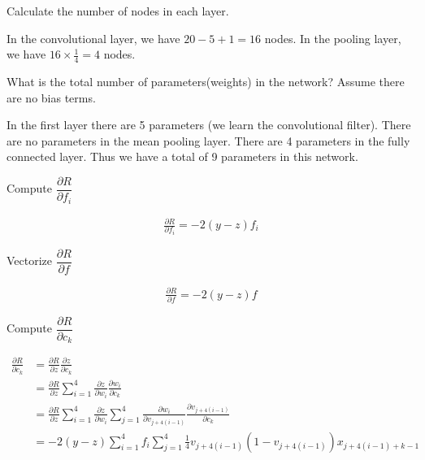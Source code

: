 \begin{Parts}
\Part Calculate the number of nodes in each layer.
\begin{solution}
In the convolutional layer, we have $20 - 5 + 1 = 16$ nodes. In the pooling layer, we have $16 \times \frac{1}{4} = 4$ nodes.
\end{solution}

\Part What is the total number of parameters(weights) in the network? Assume there are no bias terms.
\begin{solution}
In the first layer there are 5 parameters (we learn the convolutional filter). There are no parameters in the mean pooling layer. There are 4 parameters in the fully connected layer. Thus we have a total of 9 parameters in this network.
\end{solution}

\Part Compute $\dfrac{\partial R}{\partial f_i}$
\begin{solution}
\begin{align*}
    \frac{\partial R}{\partial f_i} = -2(y-z)f_i
\end{align*}
\end{solution}

\Part Vectorize $\dfrac{\partial R}{\partial f}$
\begin{solution}
\begin{align*}
    \frac{\partial R}{\partial f} = -2(y-z)f
\end{align*}
\end{solution}
\Part Compute $\dfrac{\partial R}{\partial c_k}$
\begin{solution}
\begin{align*}
    \frac{\partial R}{\partial c_k} &= \frac{\partial R}{\partial z} \frac{\partial z}{\partial c_k} \\
    &= \frac{\partial R}{\partial z} \sum_{i=1}^4 \frac{\partial z}{\partial w_i} \frac{\partial w_i}{\partial c_k} \\
    &= \frac{\partial R}{\partial z} \sum_{i=1}^4 \frac{\partial z}{\partial w_i} \sum_{j=1}^4 \frac{\partial w_i}{\partial v_{j+4(i-1)}} \frac{\partial v_{j+4(i-1)}}{\partial c_k}\\
    &= -2(y-z) \sum_{i=1}^4 f_i \sum_{j=1}^4 \frac{1}{4} v_{j+4(i-1)} (1 - v_{j+4(i-1)}) x_{j+4(i-1) + k - 1}\\
\end{align*}
\end{solution}
\end{Parts}
